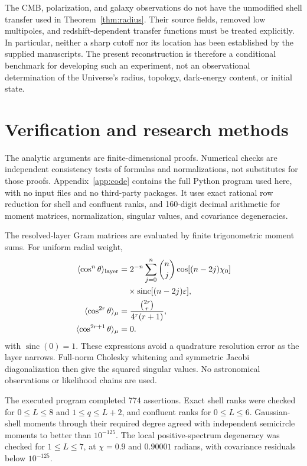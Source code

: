 \documentclass[aps,prd,reprint,amsmath,amssymb,nofootinbib,
longbibliography]{revtex4-2}
\newcommand{\ee}{\varepsilon}
\begin{document}
The CMB, polarization, and galaxy observations do not have the unmodified
shell transfer used in Theorem~\ref{thm:radius}. Their source fields,
removed low multipoles, and redshift-dependent transfer functions must
be treated explicitly. In particular, neither a sharp cutoff nor its
location has been established by the supplied manuscripts. The present
reconstruction is therefore a conditional benchmark for developing such
an experiment, not an observational determination of the Universe's
radius, topology, dark-energy content, or initial state.

\section{Verification and research methods}
\label{sec:verification}

The analytic arguments are finite-dimensional proofs. Numerical checks
are independent consistency tests of formulas and normalizations, not
substitutes for those proofs. Appendix~\ref{app:code} contains the full
Python program used here, with no input files and no third-party packages.
It uses exact rational row reduction for shell and confluent ranks,
and 160-digit decimal arithmetic for moment matrices, normalization,
singular values, and covariance degeneracies.

The resolved-layer Gram matrices are evaluated by finite trigonometric
moment sums. For uniform radial weight,
\begin{equation}
 \begin{aligned}
 \langle\cos^n\theta\rangle_{\rm layer}
 &=2^{-n}\sum_{j=0}^n\binom nj
 \cos[(n-2j)\chi_0]\\
 &\quad\times\operatorname{sinc}[(n-2j)\ee],\\
 \langle\cos^{2r}\theta\rangle_{\mu}
 &=\frac{\binom{2r}{r}}{4^r(r+1)},\\
 \langle\cos^{2r+1}\theta\rangle_{\mu}&=0 .
 \end{aligned}
 \label{eq:verificationmoments}
\end{equation}
with $\operatorname{sinc}(0)=1$. These expressions avoid a quadrature
resolution error as the layer narrows. Full-norm Cholesky whitening
and symmetric Jacobi diagonalization then give the squared singular
values. No astronomical observations or likelihood chains are used.

The executed program completed 774 assertions. Exact shell ranks were
checked for $0\leq L\leq8$ and $1\leq q\leq L+2$, and confluent ranks
for $0\leq L\leq6$. Gaussian-shell moments through their required degree
agreed with independent semicircle moments to better than $10^{-125}$.
The local positive-spectrum degeneracy was checked for $1\leq L\leq7$,
at $\chi=0.9$ and $0.90001$ radians, with covariance residuals below
$10^{-125}$.
\end{document}
